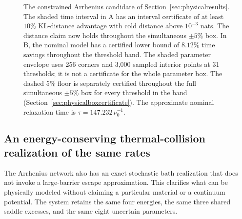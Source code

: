 \documentclass[11pt]{article}
\begin{document}
\begin{figure}[htbp]
\caption{The constrained Arrhenius candidate of Section~\ref{sec:physicalresults}.
The shaded time interval in A has an interval certificate of at least
$10\%$ KL-distance advantage with cold distance above $10^{-3}$ nats.
The distance claim now holds throughout the simultaneous $\pm5\%$ box.
In B, the nominal model has a certified lower bound of $8.12\%$ time savings
throughout the threshold band. The shaded parameter envelope uses 256 corners
and 3,000 sampled interior points at 31 thresholds; it is not a certificate
for the whole parameter box. The dashed $5\%$ floor is separately
certified throughout the full simultaneous $\pm5\%$ box for every
threshold in the band (Section~\ref{sec:physicalboxcertificate}).
The approximate nominal relaxation time is
$\tau=147.232\,\nu_0^{-1}$.}
\label{fig:physicalfinite}
\end{figure}

\subsection{An energy-conserving thermal-collision realization of the same rates}
\label{sec:thermalcollision}
The Arrhenius network also has an exact stochastic bath realization that
does not invoke a large-barrier escape approximation. This clarifies what
can be physically modeled without claiming a particular material or a
continuum potential. The system retains the same four energies, the same
three shared saddle excesses, and the same eight uncertain parameters.
\end{document}
